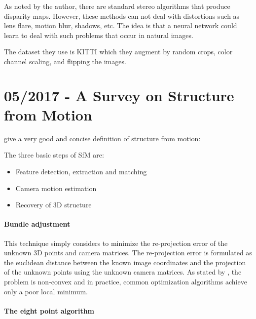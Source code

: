 		As noted by the author, there are standard stereo algorithms that produce disparity maps.
		However, these methods can not deal with distortions such as lens flare, motion blur, shadows, etc.
		The idea is that a neural network could learn to deal with such problems that occur in natural images.
		
		The dataset they use is {KITTI} which they augment by random crops, color channel scaling, and flipping the images.
		
		\section{05/2017 - A Survey on Structure from Motion}
		
			\cite{survey2017} give a very good and concise definition of structure from motion:
			
			
			The three basic steps of SfM are:
			\begin{itemize}
				\item Feature detection, extraction and matching
				\item Camera motion estimation
				\item Recovery of 3D structure
			\end{itemize}
			
			\paragraph{Bundle adjustment} 
				This technique simply considers to minimize the re-projection error of the unknown 3D points and camera matrices.
				The re-projection error is formulated as the euclidean distance between the known image coordinates and the projection of the unknown points using the unknown camera matrices.
				As stated by \cite{survey2017}, the problem is non-convex and in practice, common optimization algorithms achieve only a poor local minimum.
				
			\paragraph{The eight point algorithm}
			
